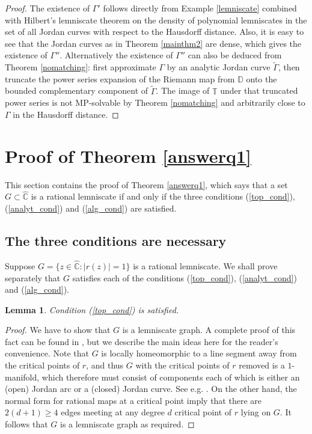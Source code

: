 \documentclass{amsart}
\theoremstyle{plain}
\newtheorem{lemma}[theorem]{Lemma}
\theoremstyle{definition}
\theoremstyle{remark}
\newcommand{\mD}{\mathbb{D}}
\newcommand{\mT}{\mathbb{T}}
\newcommand{\hC}{\widehat{\mathbb{C}}}
\renewcommand {\tilde} {\widetilde}
\begin{document}
\begin{proof}
The existence of $\Gamma'$ follows directly from Example \ref{lemniscate} combined with Hilbert's lemniscate theorem on the density of polynomial lemniscates in the set of all Jordan curves with respect to the Hausdorff distance. Also, it is easy to see that the Jordan curves as in Theorem \ref{mainthm2} are dense, which gives the existence of $\Gamma''$. Alternatively the existence of $\Gamma''$ can also be deduced from Theorem \ref{nomatching}: first approximate $\Gamma$ by an analytic Jordan curve $\tilde{\Gamma}$, then truncate the power series expansion of the Riemann map from $\mD$ onto the bounded complementary component of $\tilde{\Gamma}$. The image of $\mT$ under that truncated power series is not MP-solvable by Theorem \ref{nomatching} and arbitrarily close to $\Gamma$ in the Hausdorff distance.
\end{proof}


\section{Proof of Theorem \ref{answerq1}}
\label{sec6}

This section contains the proof of Theorem \ref{answerq1}, which says that a set $G \subset \hC$ is a rational lemniscate if and only if the three conditions (\ref{top_cond}), (\ref{analyt_cond}) and (\ref{alg_cond}) are satisfied.

\subsection{The three conditions are necessary}

Suppose $G=\{z \in \hC: |r(z)|=1\}$ is a rational lemniscate. We shall prove separately that $G$ satisfies each of the conditions (\ref{top_cond}), (\ref{analyt_cond}) and (\ref{alg_cond}).

\begin{lemma}
Condition \emph{(\ref{top_cond})} is satisfied.
\end{lemma}

\begin{proof}
We have to show that $G$ is a lemniscate graph. A complete proof of this fact can be found in \cite[Proposition 2.4]{BishopEremenkoLazebnik2025}, but we describe the main ideas here for the reader's convenience. Note that $G$ is locally homeomorphic to a line segment away from the critical points of $r$, and thus $G$ with the critical points of $r$ removed is a $1$-manifold, which therefore must consist of components each of which is either an (open) Jordan arc or a (closed) Jordan curve. See e.g. \cite{Milnor1997}. On the other hand, the normal form for rational maps at a critical point imply that there are $2(d+1)\geq4$ edges meeting at any degree $d$ critical point of $r$ lying on $G$. It follows that $G$ is a lemniscate graph as required.
\end{proof}
\end{document}
